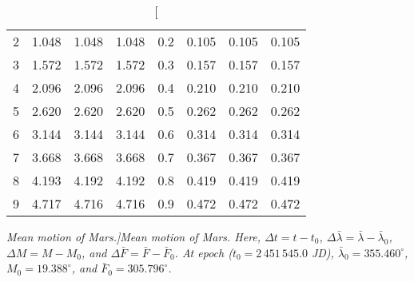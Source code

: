 \begin{table}
\begin{tabular}{rrrr|rrrr}
2 &   1.048 &   1.048 &   1.048 & 0.2 &   0.105 &   0.105 &   0.105\\
3 &   1.572 &   1.572 &   1.572 & 0.3 &   0.157 &   0.157 &   0.157\\
4 &   2.096 &   2.096 &   2.096 & 0.4 &   0.210 &   0.210 &   0.210\\
5 &   2.620 &   2.620 &   2.620 & 0.5 &   0.262 &   0.262 &   0.262\\
6 &   3.144 &   3.144 &   3.144 & 0.6 &   0.314 &   0.314 &   0.314\\
7 &   3.668 &   3.668 &   3.668 & 0.7 &   0.367 &   0.367 &   0.367\\
8 &   4.193 &   4.192 &   4.192 & 0.8 &   0.419 &   0.419 &   0.419\\
9 &   4.717 &   4.716 &   4.716 & 0.9 &   0.472 &   0.472 &   0.472\\
\end{tabular}
\caption[\em Mean motion of Mars.]{\em Mean motion of Mars.  Here, $\Delta t = t-t_0$, $\Delta\bar{\lambda} = \bar{\lambda}-\bar{\lambda}_0$, $\Delta M = M - M_0$,
and $\Delta\bar{F} = \bar{F}-\bar{F}_0$.  At epoch  ($t_0 = 2\,451\,545.0$ JD), $\bar{\lambda}_0 = 355.460^\circ$, $M_0 = 19.388^\circ$, and
$\bar{F}_0 =305.796^\circ$. }\label{vt8}
\end{table}

